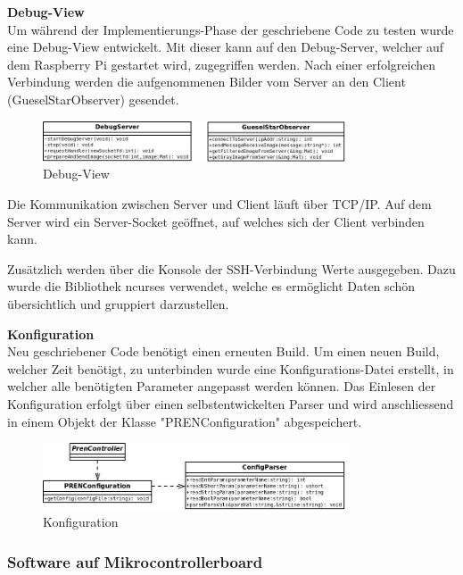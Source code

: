 \textbf{Debug-View}\\[0.2cm]
Um während der Implementierungs-Phase der geschriebene Code zu testen wurde eine Debug-View entwickelt. Mit dieser kann auf den Debug-Server, welcher auf dem Raspberry Pi gestartet wird, zugegriffen werden. Nach einer erfolgreichen Verbindung werden die aufgenommenen Bilder vom Server an den Client (GueselStarObserver) gesendet.

\begin{figure}[H]
\centering
\includegraphics[width=0.8\textwidth]{03_Loesungskonzept/pictures/DebugView.jpeg}
\caption{Debug-View}
\end{figure}

Die Kommunikation zwischen Server und Client läuft über TCP/IP. Auf dem Server wird ein Server-Socket geöffnet, auf welches sich der Client verbinden kann.

Zusätzlich werden über die Konsole der SSH-Verbindung Werte ausgegeben. Dazu wurde die Bibliothek ncurses verwendet, welche es ermöglicht Daten schön übersichtlich und gruppiert darzustellen.

\textbf{Konfiguration}\\[0.2cm]
Neu geschriebener Code benötigt einen erneuten Build. Um einen neuen Build, welcher Zeit benötigt, zu unterbinden wurde eine Konfigurations-Datei erstellt, in welcher alle benötigten Parameter angepasst werden können. Das Einlesen der Konfiguration erfolgt über einen selbstentwickelten Parser und wird anschliessend in einem Objekt der Klasse "PRENConfiguration" abgespeichert.

\begin{figure}[H]
\centering
\includegraphics[width=0.8\textwidth]{03_Loesungskonzept/pictures/Configuration.jpeg}
\caption{Konfiguration}
\end{figure}
 
\subsubsection{Software auf Mikrocontrollerboard}

